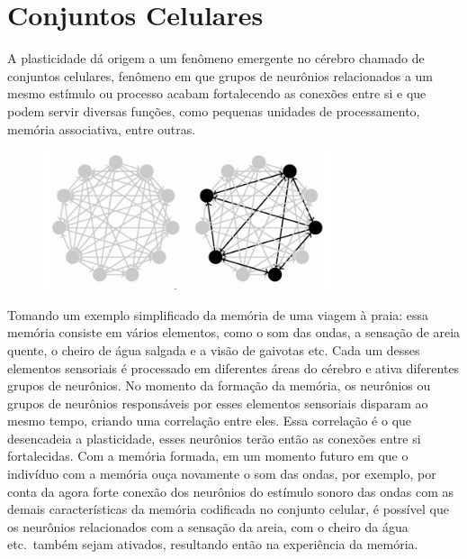 \section{Conjuntos Celulares}

A plasticidade dá origem a um fenômeno emergente no cérebro chamado de conjuntos celulares, fenômeno em que grupos de neurônios
relacionados a um mesmo estímulo ou processo acabam fortalecendo as conexões entre si e que podem servir diversas funções, como
pequenas unidades de processamento, memória associativa, entre outras.

\begin{figure}[!ht]
\centering\label{fig_conjunto_celular}
\includegraphics[width=8.5cm]{figuras/Conjunto celular.png}
\end{figure}

Tomando um exemplo simplificado da memória de uma viagem à praia: essa memória consiste em vários elementos, como o som das ondas,
a sensação de areia quente, o cheiro de água salgada e a visão de gaivotas etc. Cada um desses elementos sensoriais é processado
em diferentes áreas do cérebro e ativa diferentes grupos  de neurônios. No momento da formação da memória, os neurônios ou grupos
de neurônios responsáveis por esses elementos sensoriais disparam ao mesmo tempo, criando uma correlação entre eles. Essa
correlação é o que desencadeia a plasticidade, esses neurônios terão então as conexões entre si fortalecidas. Com a memória
formada, em um momento futuro em que o indivíduo com a memória ouça novamente o som das ondas, por exemplo, por conta da agora
forte conexão dos neurônios do estímulo sonoro das ondas com as demais características da memória codificada no conjunto celular,
é possível que os neurônios relacionados com a sensação da areia, com o cheiro da água etc.\ também sejam ativados, resultando
então na experiência da memória.

